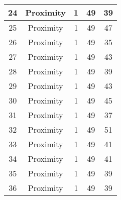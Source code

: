 \documentclass[results.tex]{subfiles}
\begin{document}
\begin{center}
\begin{tabular}{| c || c | c | c | c |}
            \hline
            24                      & Proximity                    & 1                      & 49                      & 39                   \\
            \hline
            25                      & Proximity                    & 1                      & 49                      & 47                   \\
            \hline
            26                      & Proximity                    & 1                      & 49                      & 35                   \\
            \hline
            27                      & Proximity                    & 1                      & 49                      & 43                   \\
            \hline
            28                      & Proximity                    & 1                      & 49                      & 39                   \\
            \hline
            29                      & Proximity                    & 1                      & 49                      & 43                   \\
            \hline
            30                      & Proximity                    & 1                      & 49                      & 45                   \\
            \hline
            31                      & Proximity                    & 1                      & 49                      & 37                   \\
            \hline
            32                      & Proximity                    & 1                      & 49                      & 51                   \\
            \hline
            33                      & Proximity                    & 1                      & 49                      & 41                   \\
            \hline
            34                      & Proximity                    & 1                      & 49                      & 41                   \\
            \hline
            35                      & Proximity                    & 1                      & 49                      & 39                   \\
            \hline
            36                      & Proximity                    & 1                      & 49                      & 39                   \\

\end{tabular}
\end{center}
\end{document}

